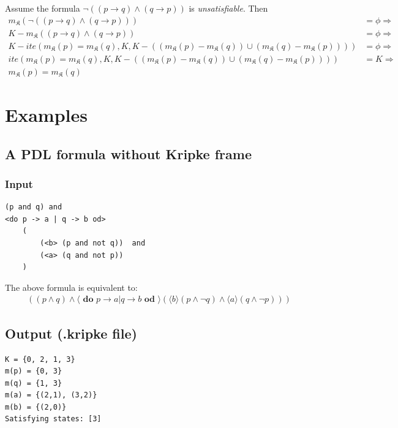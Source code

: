 \documentclass[12pt,a4paper]{article}
\begin{document}
Assume the formula $\neg ((p \rightarrow q) \wedge (q \rightarrow p))$ is \textit{unsatisfiable}. Then 
\begin{align*}
m_\mathfrak{K}(\neg ((p \rightarrow q) \wedge (q \rightarrow p))) &= \phi \Rightarrow \\
K- m_\mathfrak{K}((p \rightarrow q) \wedge (q \rightarrow p)) &= \phi \Rightarrow \\
K - ite(m_\mathfrak{K} (p) =  m_\mathfrak{K}(q), K,  K - \left( (m_\mathfrak{K}(p) - m_\mathfrak{K}(q))  \cup 
   (m_\mathfrak{K}(q) - m_\mathfrak{K}(p)) \right)) &= \phi \Rightarrow \\
   ite(m_\mathfrak{K} (p) =  m_\mathfrak{K}(q), K,  K - \left( (m_\mathfrak{K}(p) - m_\mathfrak{K}(q))  \cup 
   (m_\mathfrak{K}(q) - m_\mathfrak{K}(p)) \right)) &= K \Rightarrow \\
   m_\mathfrak{K} (p) =  m_\mathfrak{K}(q)
\end{align*}



\section{Examples}

\subsection{A PDL formula without Kripke frame}

\subsubsection*{Input}
\begin{verbatim}
(p and q) and
<do p -> a | q -> b od>
    (
        (<b> (p and not q))  and
        (<a> (q and not p))
    )
\end{verbatim}
The above formula is equivalent to:
\begin{align*}
((p \wedge q) \wedge \langle\textbf{ do }p \rightarrow a \vert q \rightarrow b\textbf{ od }\rangle(\langle b\rangle(p \wedge \neg q) \wedge \langle a \rangle(q \wedge \neg p)))
\end{align*}
\subsection*{Output (.kripke file)}
\begin{verbatim}
K = {0, 2, 1, 3}
m(p) = {0, 3}
m(q) = {1, 3}
m(a) = {(2,1), (3,2)}
m(b) = {(2,0)}
Satisfying states: [3]
\end{verbatim}
\end{document}
